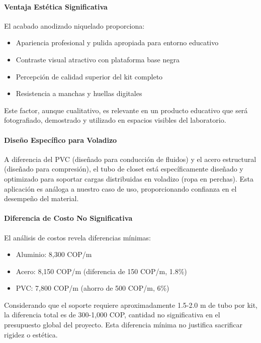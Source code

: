 \paragraph{Ventaja Estética Significativa}

El acabado anodizado niquelado proporciona:
\begin{itemize}
    \item Apariencia profesional y pulida apropiada para entorno educativo
    \item Contraste visual atractivo con plataforma base negra
    \item Percepción de calidad superior del kit completo
    \item Resistencia a manchas y huellas digitales
\end{itemize}

Este factor, aunque cualitativo, es relevante en un producto educativo que será fotografiado, demostrado y utilizado en espacios visibles del laboratorio.

\paragraph{Diseño Específico para Voladizo}

A diferencia del PVC (diseñado para conducción de fluidos) y el acero estructural (diseñado para compresión), el tubo de closet está específicamente diseñado y optimizado para soportar cargas distribuidas en voladizo (ropa en perchas). Esta aplicación es análoga a nuestro caso de uso, proporcionando confianza en el desempeño del material.

\paragraph{Diferencia de Costo No Significativa}

El análisis de costos revela diferencias mínimas:
\begin{itemize}
    \item Aluminio: 8,300 COP/m
    \item Acero: 8,150 COP/m (diferencia de 150 COP/m, 1.8\%)
    \item PVC: 7,800 COP/m (ahorro de 500 COP/m, 6\%)
\end{itemize}

Considerando que el soporte requiere aproximadamente 1.5-2.0 m de tubo por kit, la diferencia total es de 300-1,000 COP, cantidad no significativa en el presupuesto global del proyecto. Esta diferencia mínima no justifica sacrificar rigidez o estética.

